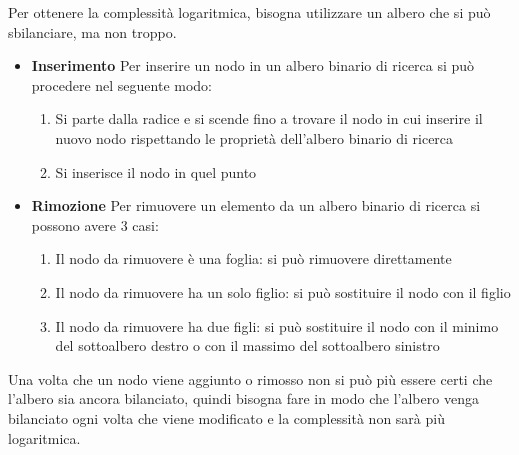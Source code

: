 \documentclass[a4paper]{article}
\begin{document}
Per ottenere la complessità logaritmica, bisogna utilizzare un albero che si può
sbilanciare, ma non troppo.

\begin{itemize}
  \item \textbf{Inserimento}
    Per inserire un nodo in un albero binario di ricerca si può procedere nel seguente modo:
    \begin{enumerate}
      \item Si parte dalla radice e si scende fino a trovare il nodo in cui inserire il
        nuovo nodo rispettando le proprietà dell'albero binario di ricerca
      \item Si inserisce il nodo in quel punto
    \end{enumerate}

  \item \textbf{Rimozione}
    Per rimuovere un elemento da un albero binario di ricerca si possono avere 3 casi:
    \begin{enumerate}
      \item Il nodo da rimuovere è una foglia: si può rimuovere direttamente
      \item Il nodo da rimuovere ha un solo figlio: si può sostituire il nodo con il figlio
      \item Il nodo da rimuovere ha due figli: si può sostituire il nodo con il minimo
        del sottoalbero destro o con il massimo del sottoalbero sinistro
    \end{enumerate}
    
\end{itemize}
Una volta che un nodo viene aggiunto o rimosso non si può più essere certi che 
l'albero sia ancora bilanciato, quindi bisogna fare in modo che l'albero venga
bilanciato ogni volta che viene modificato e la complessità non sarà più logaritmica.
\end{document}
